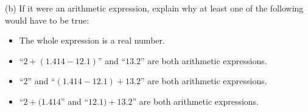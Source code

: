 \documentclass[a4paper,12pt]{article}
\begin{document}
\begin{enumerate}
(b) If it were an arithmetic expression, explain why at least one of the
following would have to be true:
\begin{itemize}
\item The whole expression is a real number.
\item ``$2+(1.414-12.1)$'' and ``$13.2$'' are both arithmetic expressions.
\item ``$2$'' and ``$(1.414-12.1)+13.2$'' are both arithmetic expressions.
\item ``$2+(1.414$'' and ``$12.1)+13.2$'' are both arithmetic expressions.
\end{itemize}
\end{enumerate}
\end{document}
